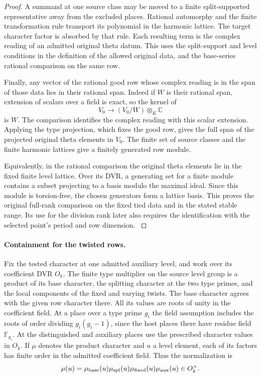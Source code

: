 \begin{proof}
A summand at one source class may be moved
to a finite split-supported representative
away from the excluded places. Rational
automorphy and the finite transformation
rule transport its polynomial in the harmonic
lattice. The target character factor is
absorbed by that rule. Each resulting term
is the complex reading of an admitted original
theta datum. This uses the split-support and
level conditions in the definition of the
allowed original data, and the base-series
rational comparison on the same row.

Finally, any vector of the rational good row
whose complex reading is in the span of those
data lies in their rational span. Indeed if \(W\) is their rational span, extension of
scalars over a field is exact, so the kernel of
\[
         V_0\longrightarrow (V_0/W)\otimes_K\mathbb C
\]
is \(W\). The comparison identifies the complex reading
with this scalar extension. Applying the type projection, which
fixes the good row, gives the full span of the
projected original theta elements in \(V_0\).
The finite set of source classes and the
finite harmonic lattices give a finitely generated
row module.

Equivalently, in the rational
comparison the original theta elements lie
in the fixed finite level lattice. Over its DVR,
a generating set for a finite module contains
a subset projecting to a basis modulo the
maximal ideal. Since this module is torsion-free,
the chosen generators form a lattice basis.
This proves the original full-rank comparison
on the fixed tied data and in the stated stable
range. Its use for the division rank later
also requires the identification with the
selected point's period and row dimension.
\label{cor:theta-row-rank-2}
\end{proof}

\paragraph{Containment for the twisted rows.}
Fix the tested character at one admitted auxiliary
level, and work over its coefficient DVR \(O_k\).
The finite type multiplier on the source level
group is a product of its base character, the
splitting character at the two type primes, and
the local components of the fixed and varying
twists. The base character agrees with the
given row character there. All its values are
roots of unity in the coefficient field.
At a place over a type prime \(g_i\) the field
assumption includes the roots of order dividing
\(g_i(g_i-1)\), since the host places there have
residue field \(\mathbb F_{g_i}\).
At the distinguished and auxiliary places use
the prescribed character values in \(O_k\).
If \(\mu\) denotes the product character and \(u\) a level
element, each of its factors has finite order in the admitted
coefficient field. Thus the normalization is
\[
       \mu(u)=\mu_{\rm base}(u)\mu_{\rm spl}(u)
                          \mu_{\rm fixed}(u)\mu_{\rm aux}(u)
                       \in O_k^\times .
\]

